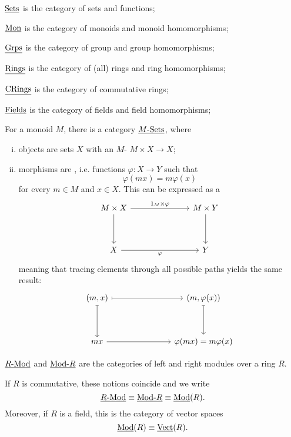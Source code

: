 \begin{examples*}
	\item \( \underline{\mathrm{Sets}} \) is the category of sets and functions;
	\item \( \underline{\mathrm{Mon}} \) is the category of monoids and monoid homomorphisms;
	\item \( \underline{\mathrm{Grps}} \) is the category of group and group homomorphisms;
	\item \( \underline{\mathrm{Rings}} \) is the category of (all) rings and ring homomorphisms;
	\item \( \underline{\mathrm{CRings}} \) is the category of commutative rings;
	\item \( \underline{\mathrm{Fields}} \) is the category of fields and field homomorphisms;
	\item For a monoid \( M \), there is a category \( \underline{M\text{-}\mathrm{Sets}} \), where
		\begin{enumerate}[(i)]
			\item objects are sets \( X \) with an \( M \)- \( M \times X \to X \);
			\item morphisms are , i.e. functions \( \varphi: X \to Y \) such that
				\[
					\varphi(mx) = m \varphi(x)
				\]
				for every \( m \in M \) and \( x \in X \). This can be expressed as a 
				\[
					\begin{tikzcd}{M \times X} &&& {M \times Y} \\
						\\
						X &&& Y
						\arrow["{1_M \times \varphi}", from=1-1, to=1-4]
						\arrow[from=1-1, to=3-1]
						\arrow[from=1-4, to=3-4]
						\arrow["\varphi"', from=3-1, to=3-4]
					\end{tikzcd}
				\]
				meaning that tracing elements through all possible paths yields the same result:
				\[
					\begin{tikzcd}{(m, x)} &&& {(m, \varphi(x))} \\
						\\
						mx &&& {\varphi(mx) = m \varphi(x)}
						\arrow[maps to, from=1-1, to=1-4]
						\arrow[maps to, from=1-1, to=3-1]
						\arrow[maps to, from=1-4, to=3-4]
						\arrow[from=3-1, to=3-4]
					\end{tikzcd}
				\]
		\end{enumerate}

	\item \( \underline{R\text{-}\mathrm{Mod}} \) and \( \underline{\mathrm{Mod}\text{-}R} \) are the categories of left and right modules over a ring \( R \).

		If \( R \) is commutative, these notions coincide and we write
		\[
			\underline{R\text{-}\mathrm{Mod}} \equiv \underline{\mathrm{Mod}\text{-}R} \equiv \underline{\mathrm{Mod}}(R).
		\]
		Moreover, if \( R \) is a field, this is the category of vector spaces
		\[
			\underline{\mathrm{Mod}}(R) \equiv \underline{\mathrm{Vect}}(R).
		\]


\end{examples*}
